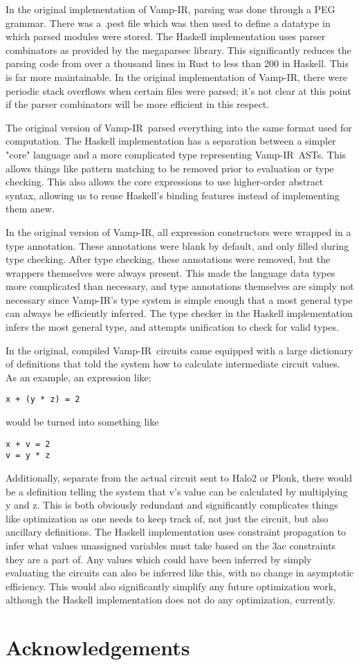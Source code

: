 \documentclass{msc}
\newcommand{\vampir}{Vamp-IR}
\begin{document}
In the original implementation of \vampir, parsing was done through a PEG grammar. There was a .pest file which was then used to define a datatype in which parsed modules were stored. The Haskell implementation uses parser combinators as provided by the megaparsec library. This significantly reduces the parsing code from over a thousand lines in Rust to less than 200 in Haskell. This is far more maintainable. In the original implementation of \vampir, there were periodic stack overflows when certain files were parsed; it's not clear at this point if the parser combinators will be more efficient in this respect.

The original version of \vampir\ parsed everything into the same format used for computation. The Haskell implementation has a separation between a simpler "core" language and a more complicated type representing \vampir\ ASTs. This allows things like pattern matching to be removed prior to evaluation or type checking. This also allows the core expressions to use higher-order abstract syntax, allowing us to reuse Haskell's binding features instead of implementing them anew.

In the original version of \vampir, all expression constructors were wrapped in a type annotation. These annotations were blank by default, and only filled during type checking. After type checking, these annotations were removed, but the wrappers themselves were always present. This made the language data types more complicated than necessary, and type annotations themselves are simply not necessary since \vampir's type system is simple enough that a most general type can always be efficiently inferred. The type checker in the Haskell implementation infers the most general type, and attempts unification to check for valid types.

In the original, compiled \vampir\ circuits came equipped with a large dictionary of definitions that told the system how to calculate intermediate circuit values. As an example, an expression like;

\begin{verbatim}
x + (y * z) = 2
\end{verbatim}
would be turned into something like
\begin{verbatim}
x + v = 2
v = y * z
\end{verbatim}
Additionally, separate from the actual circuit sent to Halo2 or Plonk, there would be a definition telling the system that v's value can be calculated by multiplying y and z. This is both obviously redundant and significantly complicates things like optimization as one needs to keep track of, not just the circuit, but also ancillary definitions. The Haskell implementation uses constraint propagation to infer what values unassigned variables must take based on the 3ac constraints they are a part of. Any values which could have been inferred by simply evaluating the circuits can also be inferred like this, with no change in asymptotic efficiency. This would also significantly simplify any future optimization work, although the Haskell implementation does not do any optimization, currently.


\section*{Acknowledgements}


\nocite{*}

\end{document}
